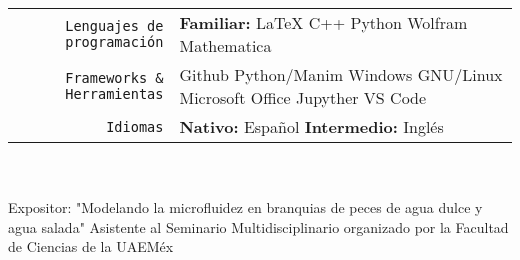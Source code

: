 \documentclass[
    10pt,
    A4,
    spanish,
    draft = false,
    twoside = false,
]{article}
\begin{document}
	\tab \begin{tabular}{r p{}}
		\texttt{\large Lenguajes de programación} & \textbf{Familiar:} LaTeX \cvContactSep C++ \cvContactSep Python \cvContactSep Wolfram Mathematica\\
		\texttt{\large Frameworks \& Herramientas} & Github \cvContactSep Python/Manim \cvContactSep Windows \cvContactSep GNU/Linux \cvContactSep Microsoft Office \cvContactSep Jupyther \cvContactSep VS Code\\
		\texttt{\large Idiomas} & \textbf{Nativo:} Español \cvContactSep \textbf{Intermedio:} Inglés \\
	\end{tabular}\\~\\
	{Expositor: "Modelando la microfluidez en branquias de peces de agua dulce y agua salada"}
	{Asistente al Seminario Multidisciplinario organizado por la Facultad de Ciencias de la UAEMéx}
\end{document}
